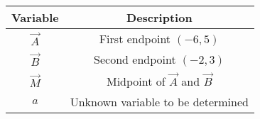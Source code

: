 \begin{tabular}{ |c| c| }
    \hline
    \textbf{Variable} & \textbf{Description} \\ \hline
    $\vec{A}$ & First endpoint $(-6,5)$ \\ \hline
    $\vec{B}$ & Second endpoint $(-2,3)$ \\ \hline
    $\vec{M}$ & Midpoint of $\vec{A}$ and $\vec{B}$ \\ \hline
    $a$ & Unknown variable to be determined \\ \hline
\end{tabular}
